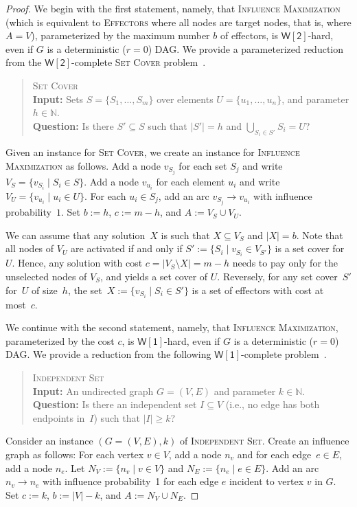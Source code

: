 \documentclass{article}
\newcommand{\wone}{{\mathsf{W[1]}}}
\newcommand{\wtwo}{{\mathsf{W[2]}}}
\newcommand{\N}{{\mathbb{N}}}
\newcommand{\probDef}[3]{
  \begin{quote}
    #1 \\
    \textbf{Input:} #2 \\
    \textbf{Question:} #3
  \end{quote}
}
\newcommand{\probSetCover}{\textsc{Set Cover}\xspace}
\newcommand{\probMaxIndependentSet}{\textsc{Independent Set}\xspace}
\newcommand{\probEffectors}{\textsc{Effectors}\xspace}
\begin{document}
\begin{proof}
  We begin with the first statement,
  namely,
  that \textsc{Influence Maximization}
  (which is equivalent to \probEffectors where all nodes are target nodes, that is, where $A = V$),
  parameterized by the maximum number $b$ of effectors,
  is $\wtwo$-hard, even if $G$ is a deterministic ($r=0$) DAG.
  We provide a parameterized reduction from the $\wtwo$-complete \probSetCover problem~\cite{DF13}.
  \probDef
    {\probSetCover}
    {Sets $S = \{S_1,\ldots,S_m\}$ over elements $U = \{u_1,\ldots,u_n\}$, and parameter $h \in \N$.}
    {Is there $S' \subseteq S$ such that $|S'| = h$ and $\bigcup_{S_i\in S'} S_i = U$?}
  Given an instance for \probSetCover, we
  create an instance for \textsc{Influence Maximization} as follows.
  Add a node $v_{S_j}$ for each set $S_j$ and write $V_S=\{v_{S_i}\mid S_i\in S\}$.
  Add a node $v_{u_i}$ for each element $u_i$ and write $V_U=\{v_{u_i}\mid u_i\in U\}$.
  For each $u_i \in S_j$, add an arc $v_{S_j} \to v_{u_i}$ with influence
  probability~$1$.
  Set $b:=h$, $c:=m - h$, and $A:= V_S\cup V_U$.
  
  We can assume that any solution~$X$ is such that  $X\subseteq V_S$ and  $|X|=b$. 
  Note that all nodes of $V_U$ are activated if and only if $S':=\{S_i\mid v_{S_i}\in V_{S'}\}$ is a set cover for $U$.
  Hence, any solution with cost 
  $c=|V_S\setminus X|=m -h$ needs to pay only for the unselected nodes of $V_S$, and yields a set cover of $U$.
  Reversely, for any set cover~$S'$ for~$U$ of size~$h$, the set~$X:=\{v_{S_i}\mid S_i\in S'\}$
  is a set of effectors with cost at most~$c$.
  
  We continue with the second statement,
  namely,
  that \textsc{Influence Maximization},
  parameterized by the cost $c$,
  is $\wone$-hard, even if $G$ is a deterministic ($r=0$) DAG.
  We provide a reduction from the following $\wone$-complete problem~\cite{DF13}.
  \probDef
    {\probMaxIndependentSet}
    {An undirected graph  $G = (V,E)$ and parameter $k \in \N$.}
    {Is there an independent set $I \subseteq V$ (i.e., no edge has both endpoints in~$I$) such that $|I|\geq  k$?}
  Consider an instance $(G=(V,E), k)$ of \probMaxIndependentSet. Create an influence graph as follows:
  For each vertex $v\in V$, add a node $n_v$ and for each edge~$e\in E$, add a node $n_e$. 
  Let $N_V:=\{n_v\mid v\in V\}$ and $N_E:=\{n_e\mid e\in E\}$.
  Add an arc $n_v \to n_e$ with influence probability~1 for each edge $e$ incident to vertex $v$ in $G$. 
  Set $c:=k$, $b:=|V|-k$, and $A:=N_V\cup N_E$.
 

\end{proof}
\end{document}

